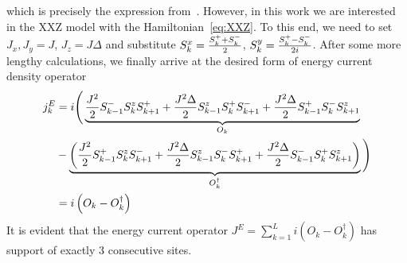which is precisely the expression from~\textcite{Zotos1997}. 
However, in this work we are interested in the XXZ model with the Hamiltonian~\eqref{eq:XXZ}. To this end,
we need to set \(J_x, J_y = J\), \(J_z = J \Delta \) and substitute \(S^{x}_k = \frac{S^{+}_k + S^{-}_k}{2}\), \(S^{y}_k = \frac{S^{+}_k-S^{-}_k}{2i}\).
After some more lengthy calculations, we finally arrive at the desired form of energy current density operator
\begin{align}
    j_k^E &= i \Bigg( \underbrace{\frac{J^2}{2} S^{-}_{k-1}S^{z}_k S^{+}_{k+1} + \frac{J^2\Delta}{2} S^{z}_{k-1}S^{+}_k S^{-}_{k+1} + \frac{J^2\Delta}{2} S^{+}_{k-1}S^{-}_kS^{z}_{k+1}}_{O_k} \nonumber \\
    &- \underbrace{\left(\frac{J^2}{2} S^{+}_{k-1}S^{z}_k S^{-}_{k+1} + \frac{J^2\Delta}{2} S^{z}_{k-1}S^{-}_k S^{+}_{k+1} + \frac{J^2\Delta}{2} S^{-}_{k-1}S^{+}_{k} S^{z}_{k+1} \right)}_{O_k^{\dagger}}\Bigg) \nonumber \\
    &= i\left(O_k - O_k^{\dagger}\right)
    \label{eq:final energy current density}
\end{align}
It is evident that the energy current operator \(J^E = \sum_{k=1}^L i \left(O_k - O_k^{\dagger}\right) \) has support of exactly \(3\) consecutive sites.

